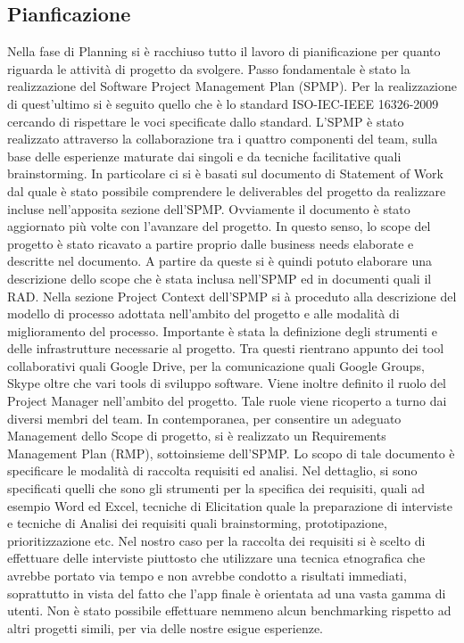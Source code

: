 \subsection{Pianficazione}
Nella fase di Planning si \`{e} racchiuso tutto il lavoro di pianificazione per quanto riguarda le attivit\`{a} di progetto da svolgere. Passo fondamentale \`{e} stato la realizzazione del Software Project Management Plan (SPMP). Per la realizzazione di quest’ultimo si \`{e} seguito quello che \`{e} lo standard ISO-IEC-IEEE 16326-2009 cercando di rispettare le voci specificate dallo standard.
L’SPMP \`{e} stato realizzato attraverso la collaborazione tra i quattro componenti del team, sulla base delle esperienze maturate dai singoli e da tecniche facilitative quali brainstorming.
In particolare ci si \`{e} basati sul documento di Statement of Work dal quale \`{e} stato possibile comprendere le deliverables del progetto da realizzare incluse nell\rq apposita sezione dell\rq SPMP.
Ovviamente il documento \`{e} stato aggiornato pi\`{u} volte con l’avanzare del progetto. In questo senso, lo scope del progetto \`{e} stato ricavato a partire proprio dalle business needs elaborate e descritte nel documento.
A partire da queste si è quindi potuto elaborare una descrizione dello scope che è stata inclusa nell\rq SPMP ed in documenti quali il RAD.
Nella sezione Project Context dell\rq SPMP si \`{a} proceduto alla descrizione del modello di processo adottata nell\rq ambito del progetto e alle modalit\`{a} di miglioramento del processo.
Importante \`{e} stata la definizione degli strumenti e delle infrastrutture necessarie al progetto. Tra questi rientrano appunto dei tool collaborativi quali Google Drive, per la comunicazione quali Google Groups, Skype oltre che vari tools di sviluppo software.
Viene inoltre definito il ruolo del Project Manager nell’ambito del progetto. Tale ruole viene ricoperto a turno dai diversi membri del team.
In contemporanea, per consentire un adeguato Management dello Scope di progetto, si \`{e} realizzato un Requirements Management Plan (RMP), sottoinsieme dell\rq SPMP. Lo scopo di tale documento \`{e} specificare le modalit\`{a} di raccolta requisiti ed analisi. 
Nel dettaglio, si sono specificati quelli che sono gli strumenti per la specifica dei requisiti, quali ad esempio Word ed Excel, tecniche di Elicitation quale la preparazione di interviste e tecniche di Analisi dei requisiti quali brainstorming, prototipazione, prioritizzazione etc.
Nel nostro caso per la raccolta dei requisiti si \`{e} scelto di effettuare delle interviste piuttosto che utilizzare una tecnica etnografica che avrebbe portato via tempo e non avrebbe condotto a risultati immediati, soprattutto in vista del fatto che l’app finale \`{e} orientata ad una vasta gamma di utenti. Non \`{e} stato possibile effettuare nemmeno alcun benchmarking rispetto ad altri progetti simili, per via delle nostre esigue esperienze.
